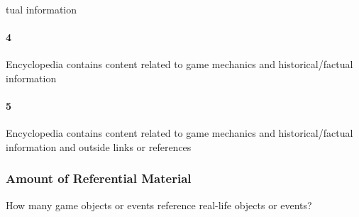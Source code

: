 tual information\paragraph{4}Encyclopedia contains content related to game mechanics and historical/factual information\paragraph{5}Encyclopedia contains content related to game mechanics and historical/factual information and outside links or references\subsubsection{Amount of Referential Material}How many game objects or events reference real-life objects or events?\parag